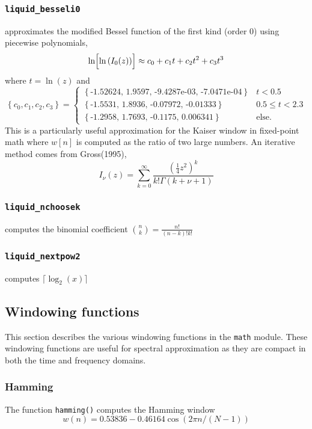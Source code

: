 \subsubsection{{\tt liquid\_besseli0}}
\label{module:math:transcendentals:besseli0}
    approximates the modified Bessel function of the first kind (order 0)
    using piecewise polynomials,
\[
    \ln\Bigl[\ln\left(I_0(z)\right)\Bigr] \approx
    c_0 + c_1 t + c_2 t ^2 + c_3 t^3
\]
where $t=\ln(z)$ and
\[
    \left\{c_0,c_1,c_2,c_3\right\} =
    \begin{cases}
    \left\{\text{-1.52624, 1.9597, -9.4287e-03, -7.0471e-04}\right\} & t < 0.5 \\
    \left\{\text{-1.5531, 1.8936, -0.07972, -0.01333}\right\} & 0.5 \le t < 2.3 \\
    \left\{\text{-1.2958, 1.7693, -0.1175, 0.006341}\right\} & \text{else}.
    \end{cases}
\]
This is a particularly useful approximation for the Kaiser window in
fixed-point math where $w[n]$ is computed as the ratio of two large numbers.
%
An iterative method comes from Gross(1995),
\[
    I_\nu(z) = \sum_{k=0}^{\infty}{\frac{\left(\frac{1}{4}z^2\right)^k}{k!\Gamma(k+\nu+1)}}
\]

\subsubsection{{\tt liquid\_nchoosek}}
\label{module:math:transcendentals:nchoosek}
    computes the binomial coefficient ${n \choose k} = \frac{n!}{(n-k)!k!}$

\subsubsection{{\tt liquid\_nextpow2}}
\label{module:math:transcendentals:nextpow2}
    computes $\lceil \log_2(x) \rceil$


\subsection{Windowing functions}
\label{module:math:window}
This section describes the various windowing functions in the {\tt math}
module.
These windowing functions are useful for spectral approximation as they
are compact in both the time and frequency domains.

\subsubsection{Hamming}
\label{module:math:window:hamming}
The function {\tt hamming()} computes the Hamming window
%
\begin{equation}
\label{eqn:math:window:hamming}
    w(n) = 0.53836 - 0.46164 \cos\left( 2 \pi n / (N-1) \right)
\end{equation}
%

